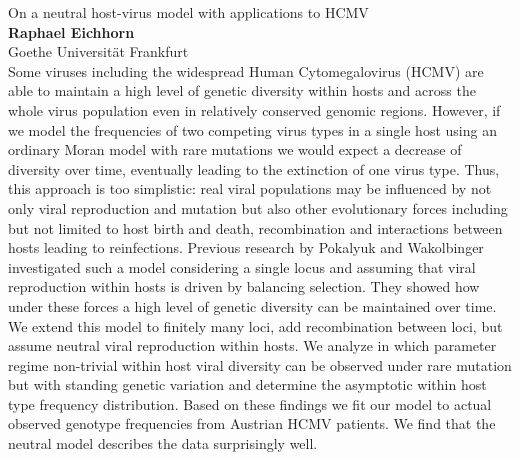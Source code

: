 \documentclass[12pt,a4paper]{article}
\begin{document}
\bigskip \bigskip  %

\noindent
{\Large On a neutral host-virus model with applications to HCMV}\\[1ex]
{\large 
\textbf{Raphael Eichhorn}\\[1ex] Goethe Universität Frankfurt}\\[2ex]
Some viruses including the widespread Human Cytomegalovirus (HCMV) are able to maintain a high level of genetic diversity within hosts and across the whole virus population even in relatively conserved genomic regions. However, if we model the frequencies of two competing virus types in a single host using an ordinary Moran model with rare mutations we would expect a decrease of diversity over time, eventually leading to the extinction of one virus type. Thus, this approach is too simplistic: real viral populations may be influenced by not only viral reproduction and mutation but also other evolutionary forces including but not limited to host birth and death, recombination and interactions between hosts leading to reinfections. Previous research by Pokalyuk and Wakolbinger investigated such a model considering a single locus and assuming that viral reproduction within hosts is driven by balancing selection. They showed how under these forces a high level of genetic diversity can be maintained over time. We extend this model to finitely many loci, add recombination between loci, but assume neutral viral reproduction within hosts. We analyze in which parameter regime non-trivial within host viral diversity can be observed under rare mutation but with standing genetic variation and determine the asymptotic within host type frequency distribution. Based on these findings we fit our model to actual observed genotype frequencies from Austrian HCMV patients. We find that the neutral model describes the data surprisingly well. 

\bigskip \bigskip  %
\end{document}
